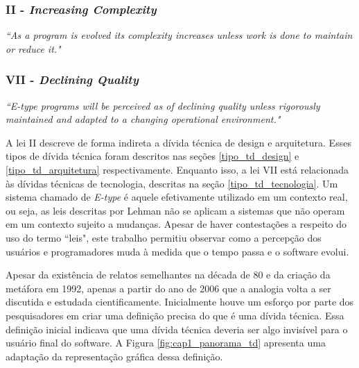 \subsubsection{II - \textit{Increasing Complexity}}
\textit{``As a program is evolved its complexity increases unless work is done to maintain or reduce it."}

\subsubsection{VII - \textit{Declining Quality}}
\textit{``E-type programs will be perceived as of declining quality unless rigorously maintained and
adapted to a changing operational environment."}

A lei II descreve de forma indireta a dívida técnica de design e arquitetura. Esses tipos de dívida técnica foram descritos nas seções \ref{tipo_td_design} e \ref{tipo_td_arquitetura} respectivamente. Enquanto isso, a lei VII está relacionada às dívidas técnicas de tecnologia, descritas na seção \ref{tipo_td_tecnologia}. Um sistema chamado de \textit{E-type} é aquele efetivamente utilizado em um contexto real, ou seja, as leis descritas por Lehman não se aplicam a sistemas que não operam em um contexto sujeito a mudanças.  Apesar de haver contestações a respeito do uso do termo ``leis", este trabalho permitiu observar como a percepção dos usuários e programadores muda à medida que o tempo passa e o software evolui.  

Apesar da existência de relatos semelhantes na década de 80 e da criação da metáfora em 1992, apenas a partir do ano de 2006 \cite{mar2006technical} que a analogia volta a ser discutida e estudada cientificamente. Inicialmente houve um esforço por parte dos pesquisadores em criar uma definição precisa do que é uma dívida técnica. Essa definição inicial indicava que uma dívida técnica deveria ser algo invisível para o usuário final do software. A Figura \ref{fig:cap1_panorama_td} apresenta uma adaptação da representação gráfica dessa definição. 


